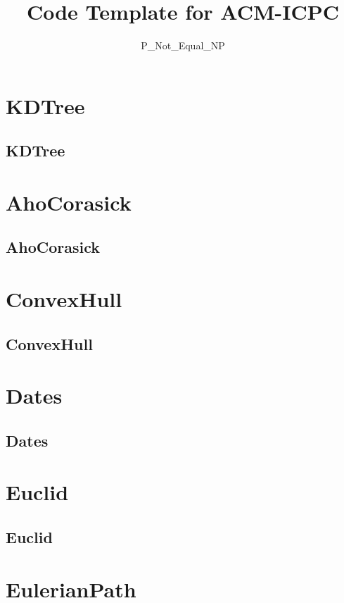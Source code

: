 \documentclass[a4paper, twocolumn]{article}
\title{Code Template for ACM-ICPC}
\author{P\_Not\_Equal\_NP}
\begin{document}
\begin{titlepage}
\pagestyle{fancy}
\lhead{}
\rhead{}
\cfoot{}
\tableofcontents
\end{titlepage}

\pagestyle{fancy}
\cfoot{- \thepage \ -}
  
\section{KDTree}
\subsection{KDTree}

\section{AhoCorasick}
\subsection{AhoCorasick}

\section{ConvexHull}
\subsection{ConvexHull}

\section{Dates}
\subsection{Dates}

\section{Euclid}
\subsection{Euclid}

\section{EulerianPath}
\end{document}
